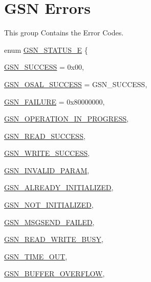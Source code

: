 \hypertarget{a00659}{
\section{GSN Errors}
\label{a00659}
}


This group Contains the Error Codes.  


\begin{DoxyCompactItemize}
\item 
enum \hyperlink{a00659_ga476ae1caf992f8287176b2cc414c8707}{GSN\_\-STATUS\_\-E} \{ \par
\hyperlink{a00659_gga476ae1caf992f8287176b2cc414c8707aa518ede9f4651bd315723e868d18f1e2}{GSN\_\-SUCCESS} =  0x00, 
\par
\hyperlink{a00659_gga476ae1caf992f8287176b2cc414c8707a7110267b17c4bb48d3308f4a993e95a4}{GSN\_\-OSAL\_\-SUCCESS} =  GSN\_\-SUCCESS, 
\par
\hyperlink{a00659_gga476ae1caf992f8287176b2cc414c8707a61f45bbd1257398ddf7091b017d43f88}{GSN\_\-FAILURE} =  0x80000000, 
\par
\hyperlink{a00659_gga476ae1caf992f8287176b2cc414c8707adaba31fb7820d714c2f8cb66ed6d5bcf}{GSN\_\-OPERATION\_\-IN\_\-PROGRESS}, 
\par
\hyperlink{a00659_gga476ae1caf992f8287176b2cc414c8707a86a353d31341ffaea1673dcd88573bad}{GSN\_\-READ\_\-SUCCESS}, 
\par
\hyperlink{a00659_gga476ae1caf992f8287176b2cc414c8707a99d3442f05ae3d0d5c76484f3bd4c3eb}{GSN\_\-WRITE\_\-SUCCESS}, 
\par
\hyperlink{a00659_gga476ae1caf992f8287176b2cc414c8707a9afd53c81a711623ea31bb9f25471dfa}{GSN\_\-INVALID\_\-PARAM}, 
\par
\hyperlink{a00659_gga476ae1caf992f8287176b2cc414c8707a33bdc119848b9830b26add61fed7a377}{GSN\_\-ALREADY\_\-INITIALIZED}, 
\par
\hyperlink{a00659_gga476ae1caf992f8287176b2cc414c8707ad2cf00de07c6a4961d4f5d6c333ea5a0}{GSN\_\-NOT\_\-INITIALIZED}, 
\par
\hyperlink{a00659_gga476ae1caf992f8287176b2cc414c8707a9b5f488607db28aa9b06e4f085e99b27}{GSN\_\-MSGSEND\_\-FAILED}, 
\par
\hyperlink{a00659_gga476ae1caf992f8287176b2cc414c8707a10812f5beec9c2c2c0e316439f3395d3}{GSN\_\-READ\_\-WRITE\_\-BUSY}, 
\par
\hyperlink{a00659_gga476ae1caf992f8287176b2cc414c8707adebd73fde19b042cd871ac4c7ec49028}{GSN\_\-TIME\_\-OUT}, 
\par
\hyperlink{a00659_gga476ae1caf992f8287176b2cc414c8707ad1d314b954e6cfaf6db84ea20660bbb7}{GSN\_\-BUFFER\_\-OVERFLOW}, 

\end{DoxyCompactItemize}
